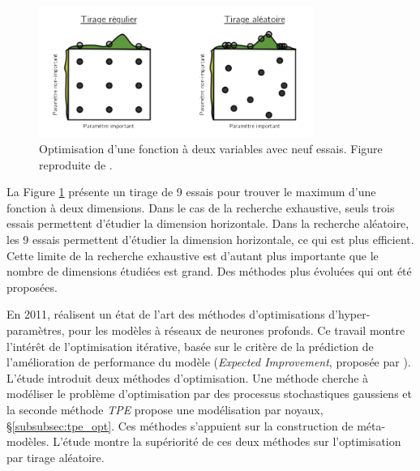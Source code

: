 \begin{figure}[hbtp]
    \centering
    \includegraphics[width=0.80\textwidth,height=\textheight,keepaspectratio]{../Chap4/Figures/bergstra_RandomSearch2002.png}
    \caption{Optimisation d'une fonction à deux variables avec neuf essais. Figure reproduite de \cite{bergstra_random_2012}.}
    \label{fig:random_search}
\end{figure}

La Figure \ref{fig:random_search} présente un tirage de 9 essais pour trouver le maximum d'une fonction à deux dimensions.
Dans le cas de la recherche exhaustive, seuls trois essais permettent d'étudier la dimension horizontale.
Dans la recherche aléatoire, les 9 essais permettent d'étudier la dimension horizontale, ce qui est plus efficient.
Cette limite de la recherche exhaustive est d'autant plus importante que le nombre de dimensions étudiées est grand.
Des méthodes plus évoluées qui ont été proposées.


En 2011, \citeauthor{bergstra_algorithms_2011} \cite{bergstra_algorithms_2011} réalisent un état de l'art des méthodes d'optimisations d'hyper-paramètres, pour les modèles à réseaux de neurones profonds.
Ce travail montre l'intérêt de l'optimisation itérative, basée sur le critère de la prédiction de l'amélioration de performance du modèle (\textit{Expected Improvement}, proposée par \citeauthor{jones_taxonomy_2001} \cite{jones_taxonomy_2001}).
L'étude introduit deux méthodes d'optimisation.
Une méthode cherche à modéliser le problème d'optimisation par des processus stochastiques gaussiens et la seconde méthode \textit{TPE} propose une modélisation par noyaux, §\ref{subsubsec:tpe_opt}.
Ces méthodes s'appuient sur la construction de méta-modèles.
L'étude montre la supériorité de ces deux méthodes sur l'optimisation par tirage aléatoire.

